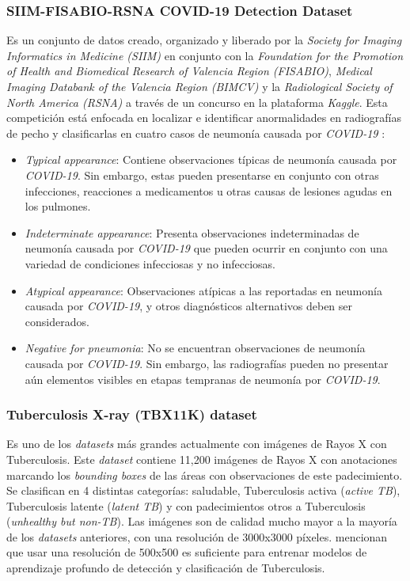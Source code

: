 \subsubsection{SIIM-FISABIO-RSNA COVID-19 Detection Dataset}

Es un conjunto de datos creado, organizado y liberado por la \textit{Society for Imaging Informatics
in Medicine (SIIM)} en conjunto con la
\textit{Foundation for the Promotion of Health and Biomedical Research of Valencia Region (FISABIO)},
\textit{Medical Imaging Databank of the Valencia Region (BIMCV)} y la
\textit{Radiological Society of North America (RSNA)} \cite{siim_det_challenge} a través de un
concurso en la plataforma \textit{Kaggle}. Esta competición está enfocada en localizar
e identificar anormalidades en radiografías de pecho y clasificarlas en cuatro casos de neumonía
causada por \textit{COVID-19} \cite{00005382-202011000-00004}:

\begin{itemize}
    \item \textit{Typical appearance}: Contiene observaciones típicas de neumonía causada por
        \textit{COVID-19}. Sin embargo, estas pueden presentarse en conjunto con otras infecciones,
        reacciones a medicamentos u otras causas de lesiones agudas en los pulmones.
    \item \textit{Indeterminate appearance}: Presenta observaciones indeterminadas de neumonía
        causada por \textit{COVID-19} que pueden ocurrir en conjunto con una variedad de
        condiciones infecciosas y no infecciosas.
    \item \textit{Atypical appearance}: Observaciones atípicas a las reportadas en neumonía causada
        por \textit{COVID-19}, y otros diagnósticos alternativos deben ser considerados.
    \item \textit{Negative for pneumonia}: No se encuentran observaciones de neumonía causada por
        \textit{COVID-19}. Sin embargo, las radiografías pueden no presentar aún elementos visibles
        en etapas tempranas de neumonía por \textit{COVID-19}.
  \end{itemize}

\subsubsection{Tuberculosis X-ray (TBX11K) dataset}

Es uno de los \textit{datasets} más grandes actualmente con imágenes de Rayos X con Tuberculosis. Este
\textit{dataset} contiene 11,200 imágenes de Rayos X con anotaciones marcando los \textit{bounding boxes} de las
áreas con observaciones de este padecimiento. Se clasifican en 4 distintas categorías:
saludable, Tuberculosis activa (\textit{active TB}), Tuberculosis latente (\textit{latent TB}) y con
padecimientos otros a
Tuberculosis (\textit{unhealthy but non-TB}). Las imágenes son de calidad mucho mayor a la mayoría de los
\textit{datasets} anteriores, con una resolución de 3000x3000 píxeles. \citeauthor{9156613} mencionan que
usar una resolución de 500x500 es suficiente para entrenar modelos de aprendizaje profundo de
detección y clasificación de Tuberculosis.


